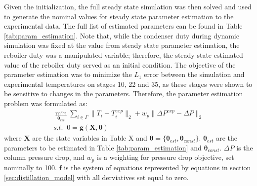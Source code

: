 Given the initialization, the full steady state simulation was then solved and used to generate the nominal values for steady state parameter estimation to the experimental data. The full list of estimated parameters can be found in Table \ref{tab:param_estimation}. Note that, while the condenser duty during dynamic simulation was fixed at the value from steady state parameter estimation, the reboiler duty was a manipulated variable; therefore, the steady-state estimated value of the reboiler duty served as an initial condition. The objective of the parameter estimation was to minimize the $L_1$ error between the simulation and experimental temperatures on stages 10, 22 and 35, as these stages were shown to be sensitive to changes in the parameters. Therefore, the parameter estimation problem was formulated as:
\begin{subequations}
    \begin{align}
        \min_{\boldsymbol \theta_{est}} \sum_{i \in \Gamma} \lVert T_i-T_i^{exp}\rVert_2 + w_p \lVert \Delta P^{exp} - \Delta P \rVert_2 \\
        s.t. \;\; 0 = \mathbf g(\mathbf X, \boldsymbol \theta)
    \end{align}
\end{subequations}
where $\mathbf X$ are the state variables in Table X  and $\boldsymbol \theta = \{\boldsymbol \theta_{est}, \boldsymbol \theta_{const} \}$.  $\boldsymbol \theta_{est}$ are the parameters to be estimated in Table \ref{tab:param_estimation} and $\boldsymbol \theta_{const}$. $\Delta P$ is the column pressure drop, and $w_p$ is a weighting for pressure drop objective, set nominally to 100.  $\mathbf f$ is the system of equations represented by equations in section \ref{sec:distillation_model} with all derviatives set equal to zero. 
